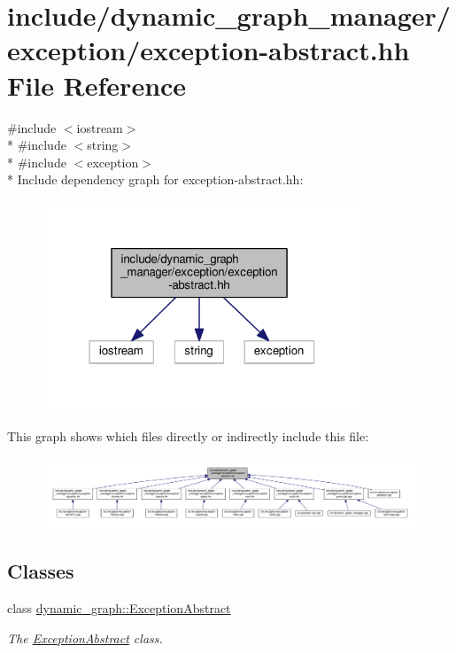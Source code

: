 \hypertarget{exception-abstract_8hh}{}\section{include/dynamic\+\_\+graph\+\_\+manager/exception/exception-\/abstract.hh File Reference}
\label{exception-abstract_8hh}
{\ttfamily \#include $<$iostream$>$}\\*
{\ttfamily \#include $<$string$>$}\\*
{\ttfamily \#include $<$exception$>$}\\*
Include dependency graph for exception-\/abstract.hh\+:
\nopagebreak
\begin{figure}[H]
\begin{center}
\leavevmode
\includegraphics[width=271pt]{exception-abstract_8hh__incl}
\end{center}
\end{figure}
This graph shows which files directly or indirectly include this file\+:
\nopagebreak
\begin{figure}[H]
\begin{center}
\leavevmode
\includegraphics[width=350pt]{exception-abstract_8hh__dep__incl}
\end{center}
\end{figure}
\subsection*{Classes}
\begin{DoxyCompactItemize}
\item 
class \hyperlink{classdynamic__graph_1_1ExceptionAbstract}{dynamic\+\_\+graph\+::\+Exception\+Abstract}
\begin{DoxyCompactList}\small\item\em The \hyperlink{classdynamic__graph_1_1ExceptionAbstract}{Exception\+Abstract} class. \end{DoxyCompactList}\end{DoxyCompactItemize}
